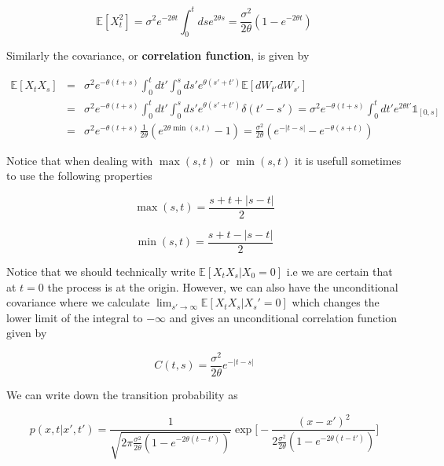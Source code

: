 \documentclass[11pt,a4paper]{article}
\begin{document}
\begin{equation}
    \mathbb{E}[X_t^2] = \sigma^2e^{-2 \theta t} \int_{0}^t dse^{2\theta s} = \frac{\sigma^2}{2\theta}(1-e^{- 2\theta t})
\end{equation}

Similarly the covariance, or \textbf{correlation function}, is given by

\begin{eqnarray}
    \mathbb{E}[X_tX_s] &=& \sigma^2e^{-\theta(t+s)} \int_{0}^t dt'\int_{0}^{s}ds'e^{\theta (s'+t')} \mathbb{E}[dW_{t'}dW_{s'}] \nonumber \\
    &=& \sigma^2e^{-\theta(t+s)} \int_{0}^t dt'\int_{0}^{s}ds'e^{\theta (s'+t')} \delta(t'-s') = \sigma^2e^{-\theta(t+s)} \int_{0}^t dt'e^{2\theta t'}\mathds{1}_{[0,s]} \nonumber \\
    &=& \sigma^2e^{-\theta(t+s)} \frac{1}{2\theta}(e^{2 \theta \min(s,t)}-1) = \frac{\sigma^2}{2 \theta}(e^{-|t-s|}-e^{-\theta(s+t)}) 
\end{eqnarray}

Notice that when dealing with $\max(s,t)$ or $\min(s,t)$ it is usefull sometimes to use the following properties

\begin{equation}
    \max(s,t) = \frac{s+t+|s-t|}{2}
\end{equation}

\begin{equation}
    \min(s,t) = \frac{s+t-|s-t|}{2}
\end{equation}

Notice that we should technically write $\mathbb{E}[X_tX_s|X_0 = 0]$ i.e we are certain that at $t=0$ the process is at the origin. However, we can also have the unconditional covariance where we calculate $\lim_{s' \to \infty}\mathbb{E}[X_tX_s|X_s' = 0]$ which changes the lower limit of the integral to $-\infty$ and gives an unconditional correlation function given by

\begin{equation}
    C(t,s) = \frac{\sigma^2}{2 \theta}e^{-|t-s|}
\end{equation}

We can write down the transition probability as

\begin{equation}
    p(x,t|x',t') = \frac{1}{\sqrt{2\pi \frac{\sigma^2}{2\theta}(1-e^{- 2\theta (t-t')})}}\exp\Biggl[-\frac{(x-x')^2}{2\frac{\sigma^2}{2\theta}(1-e^{- 2\theta (t-t')})}\Biggl]
\end{equation}
\end{document}
